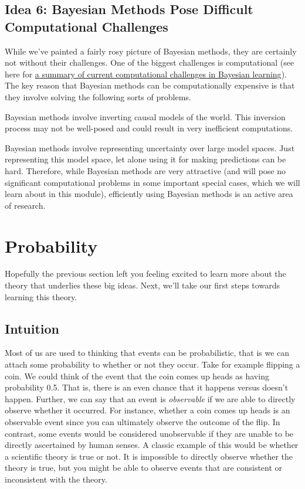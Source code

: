 \documentclass[assignment01_Solutions]{subfiles}
\begin{document}
\subsection*{Idea 6: Bayesian Methods Pose Difficult Computational Challenges}
While we've painted a fairly rosy picture of Bayesian methods, they are certainly not without their challenges.  One of the biggest challenges is computational (see here for \href{https://link.springer.com/article/10.1007/s11222-015-9574-5}{a summary of current computational challenges in Bayesian learning}).  The key reason that Bayesian methods can be computationally expensive is that they involve solving the following sorts of problems.
\bi
\item Bayesian methods involve inverting causal models of the world.  This inversion process may not be well-posed and could result in very inefficient computations.
\item Bayesian methods involve representing uncertainty over large model spaces.  Just representing this model space, let alone using it for making predictions can be hard.
\ei
Therefore, while Bayesian methods are very attractive (and will pose no significant computational problems in some important special cases, which we will learn about in this module), efficiently using Bayesian methods is an active area of research.

\section{Probability}

Hopefully the previous section left you feeling excited to learn more about the theory that underlies these big ideas.  Next, we'll take our first steps towards learning this theory.

\subsection{Intuition}
Most of us are used to thinking that events can be probabilistic, that is we can attach some probability to whether or not they occur.  Take for example flipping a coin.  We could think of the event that the coin comes up heads as having probability 0.5.  That is, there is an even chance that it happens versus doesn’t happen.  Further, we can say that an event is \emph{observable} if we are able to directly observe whether it occurred.  For instance, whether a coin comes up heads is an observable event since you can ultimately observe the outcome of the flip.  In contrast, some events would be considered unobservable if they are unable to be directly ascertained by human senses.  A classic example of this would be whether a scientific theory is true or not.  It is impossible to directly observe whether the theory is true, but you might be able to observe events that are consistent or inconsistent with the theory.
\end{document}
